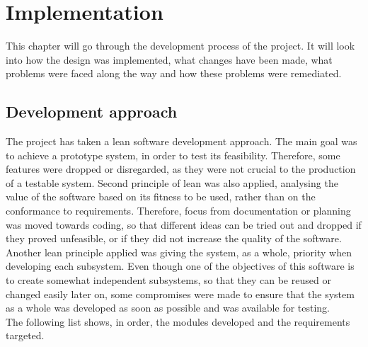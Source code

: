 \chapter{Implementation}
This chapter will go through the development process of the project. It will look into how the design was implemented, what changes have been made, what problems were faced along the way and how these problems were remediated.
\section{Development approach}
The project has taken a lean software development approach. The main goal was to achieve a prototype system, in order to test its feasibility. Therefore, some features were dropped or disregarded, as they were not crucial to the production of a testable system. Second principle of lean was also applied, analysing the value of the software based on its fitness to be used, rather than on the conformance to requirements. Therefore, focus from documentation or planning was moved towards coding, so that different ideas can be tried out and dropped if they proved unfeasible, or if they did not increase the quality of the software. Another lean principle applied was giving the system, as a whole, priority when developing each subsystem. Even though one of the objectives of this software is to create somewhat independent subsystems, so that they can be reused or changed easily later on, some compromises were made to ensure that the system as a whole was developed as soon as possible and was available for testing.\\
The following list shows, in order, the modules developed and the requirements targeted.

